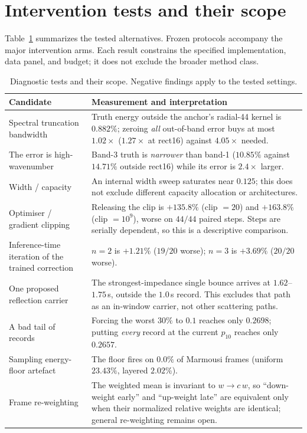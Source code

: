 \documentclass[11pt,a4paper]{article}
\begin{document}
\section{Intervention tests and their scope}

Table~\ref{tab:elim} summarizes the tested alternatives. Frozen protocols accompany the
major intervention arms. Each result constrains the specified implementation, data panel,
and budget; it does not exclude the broader method class.

\begin{table}[t]
\centering
\caption{Diagnostic tests and their scope. Negative findings apply to the tested settings.}
\label{tab:elim}
\begin{tabular}{p{}p{}}
\toprule
Candidate & Measurement and interpretation \\
\midrule
Spectral truncation bandwidth &
Truth energy outside the anchor's radial-44 kernel is $0.882\%$; zeroing \emph{all}
out-of-band error buys at most $1.02\times$ ($1.27\times$ at rect16) against $4.05\times$
needed. \\
The error is high-wavenumber &
Band-3 truth is \emph{narrower} than band-1 ($10.85\%$ against $14.71\%$ outside rect16)
while its error is $2.4\times$ larger. \\
Width / capacity &
An internal width sweep saturates near $0.125$; this does not exclude different capacity allocation or architectures. \\
Optimiser / gradient clipping &
Releasing the clip is $+135.8\%$ (clip $=20$) and $+163.8\%$ (clip $=10^9$), worse on
$44/44$ paired steps. Steps are serially dependent, so this is a descriptive comparison. \\
Inference-time iteration of the trained correction &
$n=2$ is $+1.21\%$ ($19/20$ worse); $n=3$ is $+3.69\%$ ($20/20$ worse). \\
One proposed reflection carrier &
The strongest-impedance single bounce arrives at $1.62$--$1.75$\,s, outside the $1.0$\,s
record. This excludes that path as an in-window carrier, not other scattering paths. \\
A bad tail of records &
Forcing the worst $30\%$ to $0.1$ reaches only $0.2698$; putting \emph{every} record at the
current $p_{10}$ reaches only $0.2657$. \\
Sampling energy-floor artefact &
The floor fires on $0.0\%$ of Marmousi frames (uniform $23.43\%$, layered $2.02\%$). \\
Frame re-weighting &
The weighted mean is invariant to $w \to c\,w$, so ``down-weight early'' and ``up-weight
late'' are equivalent only when their normalized relative weights are identical; general re-weighting remains open. \\
\bottomrule
\end{tabular}
\end{table}
\end{document}

